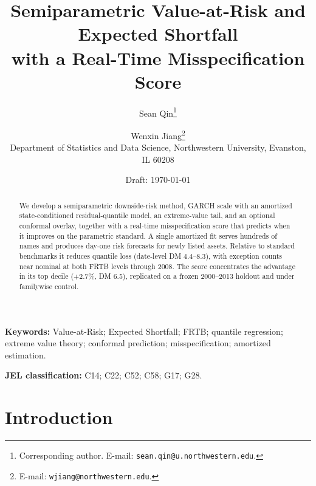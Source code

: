 \documentclass[11pt]{article}
\title{Semiparametric Value-at-Risk and Expected Shortfall\\
with a Real-Time Misspecification Score}
\author{%
  Sean Qin\thanks{Corresponding author. E-mail:
  \texttt{sean.qin@u.northwestern.edu}.}
  \and
  Wenxin Jiang\thanks{E-mail: \texttt{wjiang@northwestern.edu}.}\\[4pt]
  \normalsize Department of Statistics and Data Science, Northwestern
  University, Evanston, IL 60208}
\date{Draft: \today}
\theoremstyle{remark}
\begin{document}
\maketitle

\begin{abstract}
We develop a semiparametric downside-risk method, GARCH scale with an
amortized state-conditioned residual-quantile model, an extreme-value
tail, and an optional conformal overlay, together with a real-time
misspecification score that predicts when it improves on the parametric
standard. A single amortized fit serves hundreds of names and produces
day-one risk forecasts for newly listed assets. Relative to standard
benchmarks it reduces quantile loss (date-level DM 4.4--8.3), with
exception counts near nominal at both FRTB levels through 2008. The
score concentrates the advantage in its top decile ($+2.7\%$, DM 6.5),
replicated on a frozen 2000--2013 holdout and under familywise
control.
\end{abstract}

\noindent\textbf{Keywords:} Value-at-Risk; Expected Shortfall; FRTB;
quantile regression; extreme value theory; conformal prediction;
misspecification; amortized estimation.

\medskip
\noindent\textbf{JEL classification:} C14; C22; C52; C58; G17; G28.

\section*{Introduction}\label{sec:intro}
\end{document}
